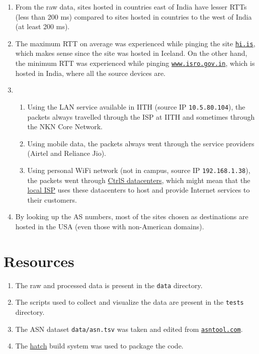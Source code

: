 \documentclass[journal,12pt,twocolumn]{IEEEtran}
\begin{document}
\begin{enumerate}
     \item From the raw data, sites hosted in countries east of India have
     lesser RTTs (less than 200 ms) compared to sites hosted in countries to the
     west of India (at least 200 ms).
     \item The maximum RTT on average was experienced while pinging the site
     \href{https://www.hi.is/}{\texttt{hi.is}}, which makes sense since the site
     was hosted in Iceland. On the other hand, the minimum RTT was experienced
     while pinging \href{https://www.isro.gov.in/}{\texttt{www.isro.gov.in}},
     which is hosted in India, where all the source devices are.
     \item 
     \begin{enumerate}
          \item Using the LAN service available in IITH (source IP
          \texttt{10.5.80.104}), the packets always travelled through the ISP at
          IITH and sometimes through the NKN Core Network.
          \item Using mobile data, the packets always went through the service
          providers (Airtel and Reliance Jio).
          \item Using personal WiFi network (not in campus, source IP
          \texttt{192.168.1.38}), the packets went through
          \href{https://www.ctrls.in/}{CtrlS datacenters}, which might mean that
          the \href{https://reachtele.net/}{local ISP} uses these datacenters to
          host and provide Internet services to their customers.
     \end{enumerate}
     \item By looking up the AS numbers, most of the sites chosen as
     destinations are hosted in the USA (even those with non-American domains).
\end{enumerate}

\section{Resources}

\begin{enumerate}
     \item The raw and processed data is present in the \texttt{data} directory.
     \item The scripts used to collect and visualize the data are present in the
     \texttt{tests} directory.
     \item The ASN dataset \texttt{data/asn.tsv} was taken and edited from
     \href{https://asntool.com/}{\texttt{asntool.com}}.
     \item The \href{https://hatch.pypa.io/latest/}{hatch} build system was used
     to package the code.
\end{enumerate}
\end{document}
